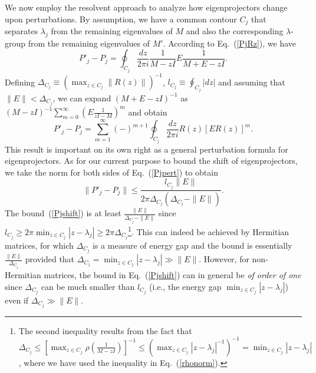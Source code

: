\documentclass{tADP2e}
\theoremstyle{plain}
\theoremstyle{plain}
\theoremstyle{definition}
\begin{document}
We now employ the resolvent approach to analyze how eigenprojectors change upon perturbations. By assumption, we have a common contour $C_j$ that separates $\lambda_j$ from the remaining eigenvalues of $M$ and also the corresponding $\lambda$-group from the remaining eigenvalues of $M'$. According to Eq.~(\ref{PjRz}), we have
\begin{equation}
P'_j-P_j=\oint_{C_j}\frac{dz}{2\pi i}\frac{1}{M-zI}E\frac{1}{M+E-zI}.
\end{equation}
Defining $\Delta_{C_j}\equiv(\max_{z\in C_j}\|R(z)\|)^{-1}$, $l_{C_j}\equiv\oint_{C_j}|dz|$ and assuming that $\|E\|<\Delta_{C_j}$, we can expand $(M+E-zI)^{-1}$ as $(M-zI)^{-1}\sum^\infty_{m=0}(E\frac{1}{zI-M})^m$ and obtain
\begin{equation}
P'_j-P_j=\sum^\infty_{m=1}(-)^{m+1}\oint_{C_j}\frac{dz}{2\pi i} R(z)[ER(z)]^m.
\label{Pjpert}
\end{equation}
This result is important on its own right as a general perturbation formula for eigenprojectors.  As for our current purpose to bound the shift of eigenprojectors, we take the norm for both sides of Eq.~(\ref{Pjpert}) to obtain
\begin{equation}
\|P'_j-P_j\|\le\frac{l_{C_j}\|E\|}{2\pi\Delta_{C_j}(\Delta_{C_j}-\|E\|)}.
\label{Pjshift}
\end{equation}
The bound~(\ref{Pjshift}) is at least $\frac{\|E\|}{\Delta_{C_j}-\|E\|}$ since $l_{C_j}\ge 2\pi\min_{z\in C_j}|z-\lambda_j|\ge 2\pi\Delta_{C_j}$\footnote{The second inequality results from the fact that $\Delta_{C_j}\le[\max_{z\in C_j}\rho(\frac{1}{M-zI})]^{-1}\le(\max_{z\in C_j}|z-\lambda_j|^{-1})^{-1}=\min_{z\in C_j}|z-\lambda_j|$, where we have used the inequality in Eq.~(\ref{rhonorm}).}. This can indeed be achieved by Hermitian matrices, for which $\Delta_{C_j}$ is a measure of energy gap and the bound is essentially $\frac{\|E\|}{\Delta_{C_j}}$ provided that $\Delta_{C_j}=\min_{z\in C_j}|z-\lambda_j|\gg\|E\|$. However, for non-Hermitian matrices, the bound in Eq.~(\ref{Pjshift}) can in general be \emph{of order of one} since $\Delta_{C_j}$ can be much smaller than $l_{C_j}$ (i.e., the energy gap $\min_{z\in C_j}|z-\lambda_j|$) even if $\Delta_{C_j}\gg\|E\|$. %
\end{document}
